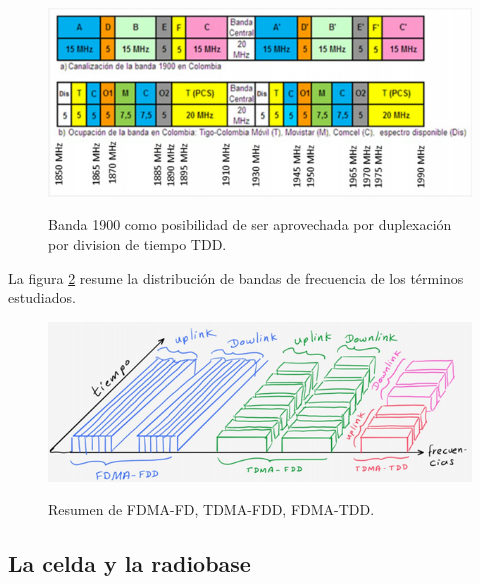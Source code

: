 \vspace{50px}

\begin{figure}[h!]
	\captionsetup{justification = raggedright, singlelinecheck = false}
	\caption{Banda 1900 como posibilidad de ser aprovechada por duplexación por division de tiempo TDD.} 
	\centering
	\includegraphics[scale=1]{Imagenes/Bandas.png}
	\label{fig:Bandas}
\end{figure}


La figura \ref{fig:FDMA} resume la distribución de bandas de frecuencia de los términos estudiados.

\begin{figure}[h!]
	\captionsetup{justification = raggedright, singlelinecheck = false}
	\caption{Resumen de FDMA-FD, TDMA-FDD, FDMA-TDD. } 
	\centering
	\includegraphics[scale=1]{Imagenes/FDMA.png}
	\label{fig:FDMA}
\end{figure}

\vspace{200px}
\subsection{La celda y la radiobase}


